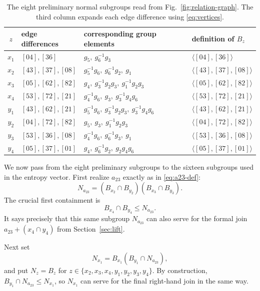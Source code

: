 \documentclass[journal]{IEEEtran}
\begin{document}
\begin{table}[!t]
\centering
\caption{The eight preliminary normal subgroups read from
Fig.~\ref{fig:relation-graph}.  The third column expands each edge difference
using \eqref{eq:vertices}.}
\label{tab:preliminary-subgroups}
\small
\setlength{\tabcolsep}{4pt}
\begin{tabular}{c l l l}
\toprule
$z$ & edge differences & corresponding group elements & definition of $B_z$\\
\midrule
$x_1$ & $[04],[36]$ & $g_5,\ g_6^{-1}g_3$ & $\langle[04],[36]\rangle$\\
$x_2$ & $[43],[37],[08]$ & $g_5^{-1}g_6,\ g_6^{-1}g_2,\ g_1$ & $\langle[43],[37],[08]\rangle$\\
$x_3$ & $[05],[62],[82]$ & $g_4,\ g_3^{-1}g_2g_3,\ g_1^{-1}g_2g_3$ & $\langle[05],[62],[82]\rangle$\\
$x_4$ & $[53],[72],[21]$ & $g_4^{-1}g_6,\ g_3,\ g_3^{-1}g_4g_6$ & $\langle[53],[72],[21]\rangle$\\
$y_1$ & $[43],[62],[21]$ & $g_5^{-1}g_6,\ g_3^{-1}g_2g_3,\ g_3^{-1}g_4g_6$ & $\langle[43],[62],[21]\rangle$\\
$y_2$ & $[04],[72],[82]$ & $g_5,\ g_3,\ g_1^{-1}g_2g_3$ & $\langle[04],[72],[82]\rangle$\\
$y_3$ & $[53],[36],[08]$ & $g_4^{-1}g_6,\ g_6^{-1}g_3,\ g_1$ & $\langle[53],[36],[08]\rangle$\\
$y_4$ & $[05],[37],[01]$ & $g_4,\ g_6^{-1}g_2,\ g_2g_4g_6$ & $\langle[05],[37],[01]\rangle$\\
\bottomrule
\end{tabular}
\end{table}

We now pass from the eight preliminary subgroups to the sixteen subgroups
used in the entropy vector.  First realize $a_{23}$ exactly as in
\eqref{eq:a23-def}:
\begin{equation}\label{eq:a23-witness}
 N_{a_{23}}=(B_{x_2}\cap B_{y_2})(B_{x_3}\cap B_{y_3}).
\end{equation}
The crucial first containment is
\begin{equation}\label{eq:collision}
 B_{x_4}\cap B_{y_4}\le N_{a_{23}}.
\end{equation}
It says precisely that this same subgroup $N_{a_{23}}$ can also serve for the
formal join $a_{23}+(x_4\cap y_4)$ from Section~\ref{sec:lift}.

Next set
\begin{equation}\label{eq:x1-absorb}
 N_{x_1}=B_{x_1}(B_{y_1}\cap N_{a_{23}}),
\end{equation}
and put $N_z=B_z$ for
$z\in\{x_2,x_3,x_4,y_1,y_2,y_3,y_4\}$.  By construction,
$B_{y_1}\cap N_{a_{23}}\le N_{x_1}$, so $N_{x_1}$ can serve for the final
right-hand join in the same way.
\end{document}
